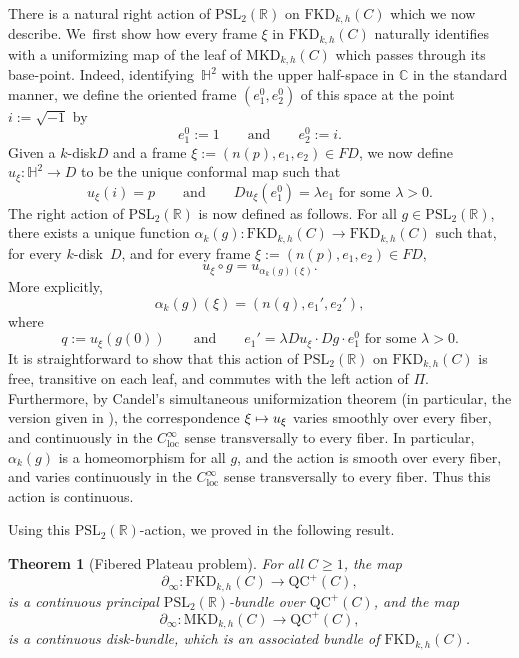 \documentclass[10pt]{amsart}
\newcommand\mto{\mathchoice{\longmapsto}{\mapsto}{\mapsto}{\mapsto}}
\newcommand{\kdisk}{$k$\nobreakdash-disk\xspace}
\theoremstyle{plain}
\newtheorem{theorem}{Theorem}[section]
\theoremstyle{definition}
\newcommand\PSL{\mathrm{PSL}_2(\mathbb{R})}
\newcommand\Hd{\mathbb{H}^2}
\newcommand{\C}{{\mathbb C}}
\newcommand{\loc}{\mathrm{loc}}
\newcommand{\QC}{\mathrm{QC}}
\newcommand{\MKD}{\mathrm{MKD}}
\newcommand{\FKD}{\mathrm{FKD}}
\newcommand{\bord}{\partial_{\infty}}
\begin{document}
There is a natural right action of $\PSL$ on $\FKD_{k,h}(C)$ which we now describe. We~first show how every frame $\xi$ in $\FKD_{k,h}(C)$ naturally identifies with a uniformizing map of the leaf of $\MKD_{k,h}(C)$ which passes through its base-point. Indeed, identifying~$\Hd$ with the upper half-space in $\C$ in the standard manner, we define the oriented frame $(e_1^0,e_2^0)$ of this space at the point $i:=\sqrt{-1}$ by
\begin{equation*}
e_1^0 := 1\qquad\text{and}\qquad e_2^0 := i.
\end{equation*}
Given a \kdisk $D$ and a frame $\xi:=(n(p),e_1,e_2)\in FD$, we now define $u_\xi:\Hd\to D$ to be the unique conformal map such that
\begin{equation*}
u_\xi(i)=p\qquad\text{and}\qquad Du_\xi(e_1^0)=\lambda e_1\,\,\text{for some }\lambda>0.
\end{equation*}
The right action of $\PSL$ is now defined as follows. For all $g\in\PSL$, there exists a unique function $\alpha_k(g):\FKD_{k,h}(C)\to\FKD_{k,h}(C)$ such that, for every \kdisk~$D$, and for every frame $\xi:=(n(p),e_1,e_2)\in FD$,
\begin{equation*}
u_\xi\circ g = u_{\alpha_k(g)(\xi)}.
\end{equation*}
More explicitly,
\begin{equation*}
\alpha_k(g)(\xi) = (n(q),e_1',e_2'),
\end{equation*}
where
\begin{equation*}
q := u_\xi(g(0))\qquad\text{and}\qquad e_1'=\lambda Du_\xi\cdot Dg\cdot e_1^0\,\,\text{for some }\lambda>0.
\end{equation*}
It is straightforward to show that this action of $\PSL$ on $\FKD_{k,h}(C)$ is free, transitive on each leaf, and commutes with the left action of $\Pi$. Furthermore, by Candel's simultaneous uniformization theorem (in particular, the version given in \cite[Th.\,2.7]{AlvarezSmith}), the correspondence $\xi\mto u_\xi$ varies smoothly over every fiber, and continuously in the $C^\infty_\loc$ sense transversally to every fiber. In particular, $\alpha_k(g)$ is a homeomorphism for all $g$, and the action is smooth over every fiber, and varies continuously in the $C^\infty_\loc$ sense transversally to every fiber. Thus this action is continuous.

Using this $\PSL$-action, we proved in \cite[Th.\,3.1.2. \& 3.2.2]{ALS} the following result.

\begin{theorem}[Fibered Plateau problem]\label{t.fibered_PP}
For all $C\geq 1$, the map
\begin{equation*}
\bord :\FKD_{k,h}(C)\to\QC^+(C),
\end{equation*}
is a continuous principal $\PSL$-bundle over $\QC^+(C)$, and the map
\begin{equation*}
\bord :\MKD_{k,h}(C)\to\QC^+(C),
\end{equation*}
is a continuous disk-bundle, which is an associated bundle of $\FKD_{k,h}(C)$.
\end{theorem}
\end{document}
